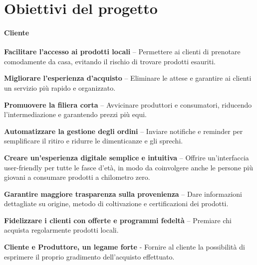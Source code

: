 \newpage
\section{Obiettivi del progetto}

\paragraph{Cliente}


\begin{objitem}
    \item \textbf{Facilitare l'accesso ai prodotti locali} – Permettere ai clienti di prenotare comodamente da casa, evitando il rischio di trovare prodotti esauriti.
    \item  \textbf{Migliorare l'esperienza d'acquisto} – Eliminare le attese e garantire ai clienti un servizio più rapido e organizzato.
    \item  \textbf{Promuovere la filiera corta} – Avvicinare produttori e consumatori, riducendo l'intermediazione e garantendo prezzi più equi.
    \item  \textbf{Automatizzare la gestione degli ordini} – Inviare notifiche e reminder per semplificare il ritiro e ridurre le dimenticanze e gli sprechi.
    \item  \textbf{Creare un'esperienza digitale semplice e intuitiva} – Offrire un'interfaccia user-friendly per tutte le fasce d'età, in modo da coinvolgere anche le persone più giovani a consumare prodotti a chilometro zero.
    \item  \textbf{Garantire maggiore trasparenza sulla provenienza} – Dare informazioni dettagliate su origine, metodo di coltivazione e certificazioni dei prodotti.
    \item  \textbf{Fidelizzare i clienti con offerte e programmi fedeltà} – Premiare chi acquista regolarmente prodotti locali.
    \item \textbf{Cliente e Produttore, un legame forte} - Fornire al cliente la possibilità di esprimere il proprio gradimento dell'acquisto effettuato.
\end{objitem}


